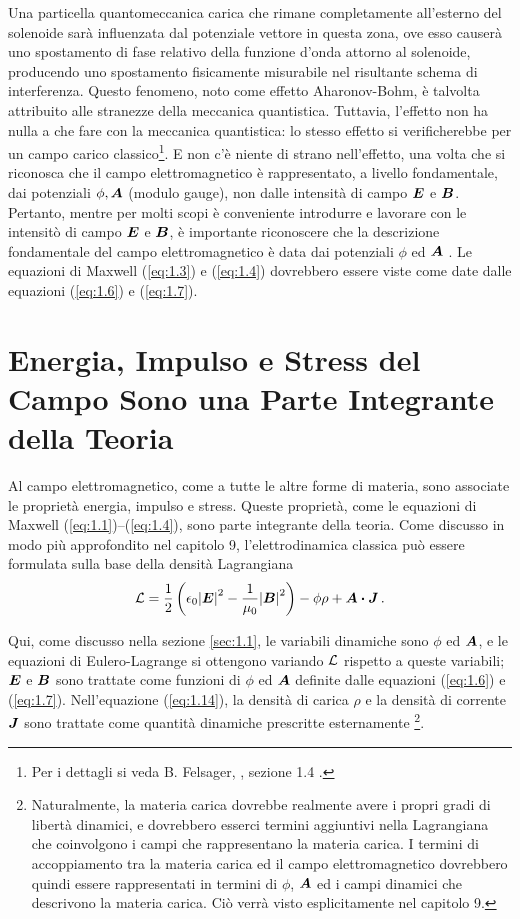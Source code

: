 Una particella quantomeccanica carica che rimane completamente all'esterno del solenoide sarà influenzata dal potenziale vettore in questa zona, ove esso causerà uno spostamento di fase relativo della funzione d'onda attorno al solenoide, producendo uno spostamento fisicamente misurabile nel risultante schema di interferenza. Questo fenomeno, noto come effetto Aharonov-Bohm, è talvolta attribuito alle stranezze della meccanica quantistica. Tuttavia, l'effetto non ha nulla a che fare con la meccanica quantistica: lo stesso effetto si verificherebbe per un campo carico classico\footnote{Per i dettagli si veda B. Felsager, , sezione 1.4 .}. 
E non c'è niente di strano nell'effetto, una volta che si riconosca che il campo elettromagnetico è rappresentato, a livello fondamentale, dai potenziali $\phi, \vb*{A}$ (modulo gauge), non dalle intensità di campo $\vb*{E}$ e $\vb*{B}$. Pertanto, mentre per molti scopi è conveniente introdurre e lavorare con le intensitò di campo $\vb*{E}$ e $\vb*{B}$, è importante riconoscere che la descrizione fondamentale del campo elettromagnetico è data dai potenziali $\phi$ ed $\vb*{A}$ . Le equazioni di Maxwell (\ref{eq:1.3}) e (\ref{eq:1.4}) dovrebbero essere viste come date dalle equazioni (\ref{eq:1.6}) e (\ref{eq:1.7}).


\section{Energia, Impulso e Stress del Campo Sono una Parte Integrante della Teoria}\label{sec:1.2}
Al campo elettromagnetico, come a tutte le altre forme di materia, sono associate le proprietà energia, impulso e stress. Queste proprietà, come le equazioni di Maxwell (\ref{eq:1.1})--(\ref{eq:1.4}), sono parte integrante della teoria. Come discusso in modo più approfondito nel capitolo 9, l'elettrodinamica classica può essere formulata sulla base della densità Lagrangiana  
\begin{equation}\label{eq:1.14}
\cL = \frac{1}{2} \left(\epsilon_0 {\abs{\vb*{E}}}^2 - \frac{1}{\mu_0} {\abs{\vb*{B}}}^2 \right) - \phi \rho + \vb*{A} \vdot \vb*{J}\,.
\end{equation}

Qui, come discusso nella sezione \ref{sec:1.1}, le variabili dinamiche sono $\phi$ ed $\vb*{A}$, e le equazioni di Eulero-Lagrange si ottengono variando $\mathcal{L}$ rispetto a queste variabili; $\vb*{E}$ e $\vb*{B}$ sono trattate come funzioni di $\phi$ ed $\vb*{A}$ definite dalle equazioni (\ref{eq:1.6}) e (\ref{eq:1.7}). Nell'equazione (\ref{eq:1.14}), la densità di carica $\rho$ e la densità di corrente $\vb*{J}$ sono trattate come quantità dinamiche prescritte esternamente
\footnote{Naturalmente, la materia carica dovrebbe realmente avere i propri gradi di libertà dinamici, e dovrebbero esserci termini aggiuntivi nella Lagrangiana che coinvolgono i campi che rappresentano la materia carica. I termini di accoppiamento tra la materia carica ed il campo elettromagnetico dovrebbero quindi essere rappresentati in termini di $\phi$, $\vb*{A}$ ed i campi dinamici che descrivono la materia carica. Ciò verrà visto esplicitamente nel capitolo 9.}. 

